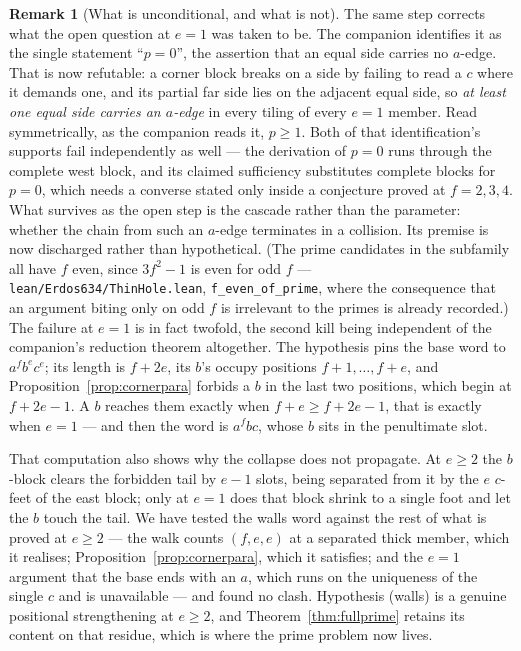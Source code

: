 \documentclass[11pt,reqno]{amsart}
\theoremstyle{plain}
\theoremstyle{definition}
\newtheorem{remark}[theorem]{Remark}
\begin{document}
\begin{remark}[What is unconditional, and what is not]
The same step corrects what the open question at $e=1$ was taken to be. The companion identifies it
as the single statement ``$p=0$'', the assertion that an equal side carries no $a$-edge. That is
now refutable: a corner block breaks on a side by failing to read a $c$ where it demands one, and its
partial far side lies on the adjacent equal side, so \emph{at least one equal side carries an
$a$-edge} in every tiling of every $e=1$ member. Read symmetrically, as the companion reads it,
$p\ge1$. Both of that identification's supports fail independently as well --- the derivation of
$p=0$ runs through the complete west block, and its claimed sufficiency substitutes complete blocks
for $p=0$, which needs a converse stated only inside a conjecture proved at $f=2,3,4$. What survives
as the open step is the cascade rather than the parameter: whether the chain from such an $a$-edge
terminates in a collision. Its premise is now discharged rather than hypothetical. (The prime candidates in the subfamily all have $f$ even, since $3f^2-1$ is even for odd $f$
--- \texttt{lean/Erdos634/ThinHole.lean}, \texttt{f\_even\_of\_prime}, where the consequence
that an argument biting only on odd $f$ is irrelevant to the primes is already recorded.) The failure at $e=1$ is in fact twofold, the second
kill being independent of the companion's reduction theorem altogether. The hypothesis pins the base word
to $a^fb^ec^e$; its length is $f+2e$, its $b$'s occupy positions $f+1,\dots,f+e$, and
Proposition~\ref{prop:cornerpara} forbids a $b$ in the last two positions, which begin at $f+2e-1$.
A $b$ reaches them exactly when $f+e\ge f+2e-1$, that is exactly when $e=1$ --- and then the word is
$a^fbc$, whose $b$ sits in the penultimate slot.

That computation also shows why the collapse does not propagate. At $e\ge2$ the $b$-block clears the
forbidden tail by $e-1$ slots, being separated from it by the $e$ $c$-feet of the east block; only at
$e=1$ does that block shrink to a single foot and let the $b$ touch the tail. We have tested the
walls word against the rest of what is proved at $e\ge2$ --- the walk counts $(f,e,e)$ at a
separated thick member, which it realises; Proposition~\ref{prop:cornerpara}, which it satisfies;
and the $e=1$ argument that the base ends with an $a$, which runs on the uniqueness of the single
$c$ and is unavailable --- and found no clash. Hypothesis (walls) is a genuine positional
strengthening at $e\ge2$, and Theorem~\ref{thm:fullprime} retains its content on that residue,
which is where the prime problem now lives.
\end{remark}
\end{document}
